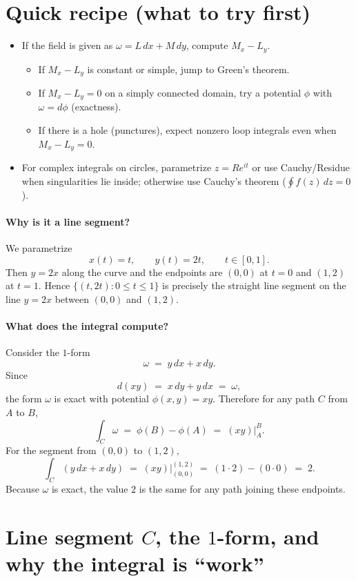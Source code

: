 \documentclass[11pt]{article}
\begin{document}
\section*{Quick recipe (what to try first)}
\begin{itemize}[leftmargin=1.25em]
	\item If the field is given as $\omega=L\,dx+M\,dy$, compute $M_x-L_y$.
	\begin{itemize}
		\item If $M_x-L_y$ is constant or simple, jump to Green's theorem.
		\item If $M_x-L_y=0$ on a simply connected domain, try a potential $\phi$ with $\omega=d\phi$ (exactness).
		\item If there is a hole (punctures), expect nonzero loop integrals even when $M_x-L_y=0$.
	\end{itemize}
	\item For complex integrals on circles, parametrize $z=Re^{it}$ or use Cauchy/Residue when singularities lie inside; otherwise use Cauchy’s theorem ($\oint f(z)\,dz=0$).
\end{itemize}	


\paragraph{Why is it a line segment?}
We parametrize
\[
x(t)=t,\qquad y(t)=2t,\qquad t\in[0,1].
\]
Then \(y=2x\) along the curve and the endpoints are \((0,0)\) at \(t=0\) and \((1,2)\) at \(t=1\).
Hence \(\{(t,2t):0\le t\le 1\}\) is precisely the straight line segment on the line \(y=2x\) between
\((0,0)\) and \((1,2)\).

\paragraph{What does the integral compute?}
Consider the $1$-form
\[
\omega \;=\; y\,dx + x\,dy.
\]
Since
\[
d(xy)\;=\; x\,dy + y\,dx \;=\; \omega,
\]
the form \(\omega\) is exact with potential \(\phi(x,y)=xy\).
Therefore for any path \(C\) from \(A\) to \(B\),
\[
\int_C \omega \;=\; \phi(B)-\phi(A)\;=\; (xy)\Big|_{A}^{B}.
\]
For the segment from \((0,0)\) to \((1,2)\),
\[
\int_C (y\,dx+x\,dy)
\;=\;
(xy)\Big|_{(0,0)}^{(1,2)}
\;=\;
(1\cdot 2)-(0\cdot 0)
\;=\; 2.
\]
Because \(\omega\) is exact, the value \(2\) is the same for any path joining these endpoints.

\section*{Line segment $C$, the $1$-form, and why the integral is ``work''}
\end{document}
